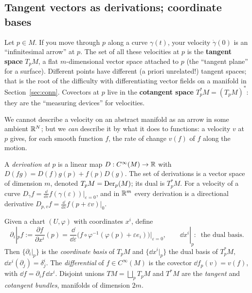 \subsection{Tangent vectors as derivations; coordinate bases}\label{sec:tangentvectors}
\begin{intuition}[{velocities}]
Let $p\in M$. If you move through $p$ along a curve $\gamma(t)$, your velocity $\dot\gamma(0)$ is an ``infinitesimal arrow'' at $p$. The set of all these velocities at $p$ is the \textbf{tangent space} $T_pM$, a flat $m$-dimensional vector space attached to $p$ (the ``tangent plane'' for a surface). Different points have different (a priori unrelated!) tangent spaces; that is the root of the difficulty with differentiating vector fields on a manifold in Section~\ref{sec:conn}. Covectors at $p$ live in the \textbf{cotangent space} $T^*_pM=(T_pM)^*$: they are the ``measuring devices'' for velocities.

We cannot describe a velocity on an abstract manifold as an arrow in some ambient $\mathbb{R}^N$; but we \emph{can} describe it by what it does to functions: a velocity $v$ at $p$ gives, for each smooth function $f$, the rate of change $v(f)$ of $f$ along the motion.
\end{intuition}

\begin{formal}
A \emph{derivation at $p$} is a linear map $D:C^\infty(M)\to\mathbb{R}$ with $D(fg)=D(f)g(p)+f(p)D(g)$. The set of derivations is a vector space of dimension $m$, denoted $T_pM=\operatorname{Der}_p(M)$; its dual is $T^*_pM$. For a velocity of a curve $D_\gamma f=\frac{\dd}{\dd\varepsilon}f(\gamma(\varepsilon))|_{\varepsilon=0}$, and in $\mathbb{R}^m$ every derivation is a directional derivative $D_{p,v}f=\frac{\dd}{\dd\varepsilon}f(p+\varepsilon v)|_0$.

Given a chart $(U,\varphi)$ with coordinates $x^i$, define
\[
\partial_i|_p f:=\frac{\partial f}{\partial x^i}(p)=\frac{\dd}{\dd\varepsilon}\Big(f\circ\varphi^{-1}(\varphi(p)+\varepsilon e_i)\Big)\Big|_{\varepsilon=0},\qquad
\dd x^i|_p:\ \text{ the dual basis.}
\]
Then $\{\partial_i|_p\}$ is the \emph{coordinate basis} of $T_pM$ and $\{\dd x^i|_p\}$ the dual basis of $T_p^*M$, \ie $\dd x^i(\partial_j)=\delta^i_j$. The \emph{differential} of $f\in C^\infty(M)$ is the covector $\dd f_p(v)=v(f)$, with $\dd f=\partial_if\,\dd x^i$. Disjoint unions $TM=\bigsqcup_pT_pM$ and $T^*M$ are the \emph{tangent} and \emph{cotangent bundles}, manifolds of dimension $2m$.
\end{formal}

